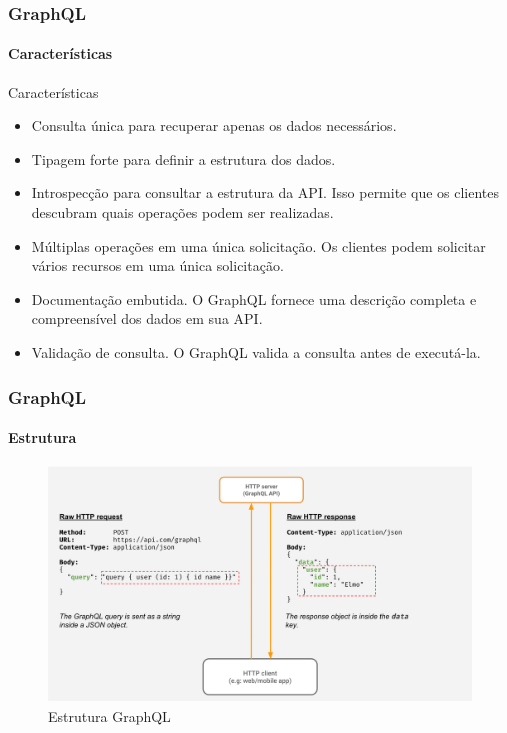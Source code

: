 \documentclass[
	9pt, %
	t, %
]{beamer}
\newcommand{\yellowbox}[1]{\colorbox{yellow!75}{#1}}
\begin{document}
\begin{frame}
	\frametitle{GraphQL}
	\framesubtitle{Características}

	\begin{block}{Características}
		\begin{itemize}
			\item \yellowbox{Consulta única} para recuperar apenas os dados necessários.
			\item \yellowbox{Tipagem forte} para definir a estrutura dos dados.
			\item \yellowbox{Introspecção} para consultar a estrutura da API. Isso permite que os clientes descubram quais operações podem ser realizadas.
			\item \yellowbox{Múltiplas operações} em uma única solicitação. Os clientes podem solicitar vários recursos em uma única solicitação.
			\item \yellowbox{Documentação} embutida. O GraphQL fornece uma descrição completa e compreensível dos dados em sua API.
			\item \yellowbox{Validação} de consulta. O GraphQL valida a consulta antes de executá-la.
		\end{itemize}
	\end{block}

\end{frame}

\begin{frame}
	\frametitle{GraphQL}
	\framesubtitle{Estrutura}

	\begin{figure}
		\includegraphics[width=0.9\linewidth]{graphql.png}
		\caption{Estrutura GraphQL}
		\label{fig:graphql_structure}
	\end{figure}

\end{frame}
\end{document}
